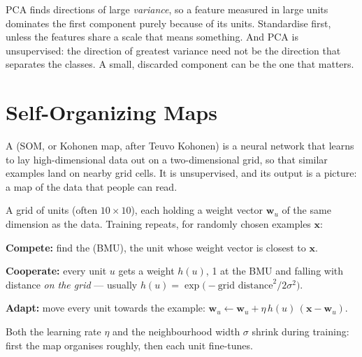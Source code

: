 \begin{alertbox}
PCA finds directions of large \emph{variance}, so a feature measured in large units
dominates the first component purely because of its units. Standardise first, unless
the features share a scale that means something. And PCA is unsupervised: the
direction of greatest variance need not be the direction that separates the classes.
A small, discarded component can be the one that matters.
\end{alertbox}

\section{Self-Organizing Maps}

A  (SOM, or Kohonen map, after Teuvo Kohonen) is a neural
network that learns to lay high-dimensional data out on a two-dimensional grid, so
that similar examples land on nearby grid cells. It is unsupervised, and its output is
a picture: a map of the data that people can read.

\begin{definitionbox}
A grid of units (often $10 \times 10$), each holding a weight vector
$\mathbf{w}_u$ of the same dimension as the data. Training repeats, for randomly chosen
examples $\mathbf{x}$:
\begin{tightnum}
  \item \textbf{Compete:} find the  (BMU), the unit whose
        weight vector is closest to $\mathbf{x}$.
  \item \textbf{Cooperate:} every unit $u$ gets a  weight
        $h(u)$, 1 at the BMU and falling with distance \emph{on the grid} ---
        usually $h(u) = \exp\!\big(-\text{grid distance}^2 / 2\sigma^2\big)$.
  \item \textbf{Adapt:} move every unit towards the example:
        $\mathbf{w}_u \leftarrow \mathbf{w}_u + \eta\,h(u)\,(\mathbf{x} - \mathbf{w}_u)$.
\end{tightnum}
Both the learning rate $\eta$ and the neighbourhood width $\sigma$ shrink during
training: first the map organises roughly, then each unit fine-tunes.
\end{definitionbox}

